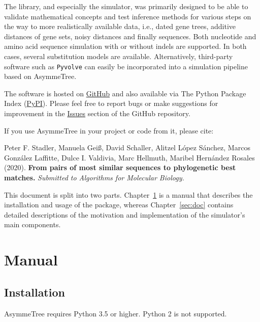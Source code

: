 \documentclass[hidelinks,11pt]{scrreprt}
\begin{document}
The library, and especially the simulator, was primarily designed to be able to validate mathematical concepts and test inference methods for various steps on the way to more realistically available data, i.e., dated gene trees, additive distances of gene sets, noisy distances and finally sequences.
Both nucleotide and amino acid sequence simulation with or without indels are supported. In both cases, several substitution models are available.
Alternatively, third-party software such as \texttt{Pyvolve} \cite{spielman2015} can easily be incorporated into a simulation pipeline based on AsymmeTree.

The software is hosted on \href{https://github.com/david-schaller/AsymmeTree}{GitHub} and also available via The Python Package Index (\href{https://pypi.org/project/asymmetree/}{PyPI}).
Please feel free to report bugs or make suggestions for improvement in the \href{https://github.com/david-schaller/AsymmeTree/issues}{Issues} section of the GitHub repository.

If you use AsymmeTree in your project or code from it, please cite:

\vspace{3mm}
\begin{adjustwidth}{1cm}{1cm}
	Peter F. Stadler, Manuela Gei{\ss}, David Schaller, Alitzel L{\'o}pez S{\'a}nchez, Marcos Gonz{\'a}lez Laffitte, Dulce I. Valdivia, Marc Hellmuth, Maribel Hern{\'a}ndez Rosales (2020). \textbf{From pairs of most similar sequences to phylogenetic best matches.} \textit{Submitted to Algorithms for Molecular Biology.}
\end{adjustwidth}
\vspace{3mm}

This document is split into two parts. Chapter~\ref{sec:manual} is a manual that describes the installation and usage of the package, whereas Chapter~\ref{sec:doc} contains detailed descriptions of the motivation and implementation of the simulator's main components.

\chapter{Manual}\label{sec:manual}

\section{Installation}

AsymmeTree requires Python 3.5 or higher. Python 2 is not supported.
\end{document}
